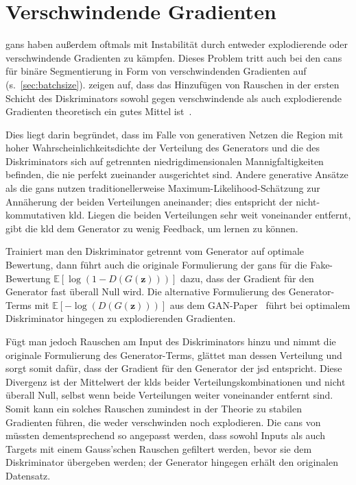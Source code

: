 \section{Verschwindende Gradienten}

\glspl{gan} haben außerdem oftmals mit Instabilität durch entweder explodierende oder verschwindende Gradienten zu kämpfen.
Dieses Problem tritt auch bei den \glspl{can} für binäre Segmentierung in Form von verschwindenden Gradienten auf (s.~\autoref{sec:batchsize}).
\citeauthor{Arjovsky.2017} zeigen auf, dass das Hinzufügen von Rauschen in der ersten Schicht des Diskriminators sowohl gegen verschwindende als auch explodierende Gradienten theoretisch ein gutes Mittel ist~\cite{Arjovsky.2017}.

Dies liegt darin begründet, dass im Falle von generativen Netzen die Region mit hoher Wahrscheinlichkeitsdichte der Verteilung des Generators und die des Diskriminators sich auf getrennten niedrigdimensionalen Mannigfaltigkeiten befinden, die nie perfekt zueinander ausgerichtet sind.
Andere generative Ansätze als die \glspl{gan} nutzen traditionellerweise Maximum-Likelihood-Schätzung zur Annäherung der beiden Verteilungen aneinander; dies entspricht der nicht-kommutativen \gls{kld}.
Liegen die beiden Verteilungen sehr weit voneinander entfernt, gibt die \gls{kld} dem Generator zu wenig Feedback, um lernen zu können.

Trainiert man den Diskriminator getrennt vom Generator auf optimale Bewertung, dann führt auch die originale Formulierung der \glspl{gan} für die Fake-Bewertung $ \mathbb{E}[\log(1 - D(G(\mathbf{z})))] $ dazu, dass der Gradient für den Generator fast überall Null wird.
Die alternative Formulierung des Generator-Terms mit $ \mathbb{E}[-\log(D(G(\mathbf{z})))] $ aus dem GAN-Paper~\cite{Goodfellow.2014} führt bei optimalem Diskriminator hingegen zu explodierenden Gradienten.

Fügt man jedoch Rauschen am Input des Diskriminators hinzu und nimmt die originale Formulierung des Generator-Terms, glättet man dessen Verteilung und sorgt somit dafür, dass der Gradient für den Generator der \gls{jsd} entspricht.
Diese Divergenz ist der Mittelwert der \glspl{kld} beider Verteilungskombinationen und nicht überall Null, selbst wenn beide Verteilungen weiter voneinander entfernt sind.
Somit kann ein solches Rauschen zumindest in der Theorie zu stabilen Gradienten führen, die weder verschwinden noch explodieren.
Die \glspl{can} von \citeauthor{Isola.2017} müssten dementsprechend so angepasst werden, dass sowohl Inputs als auch Targets mit einem Gauss'schen Rauschen gefiltert werden, bevor sie dem Diskriminator übergeben werden; der Generator hingegen erhält den originalen Datensatz.

